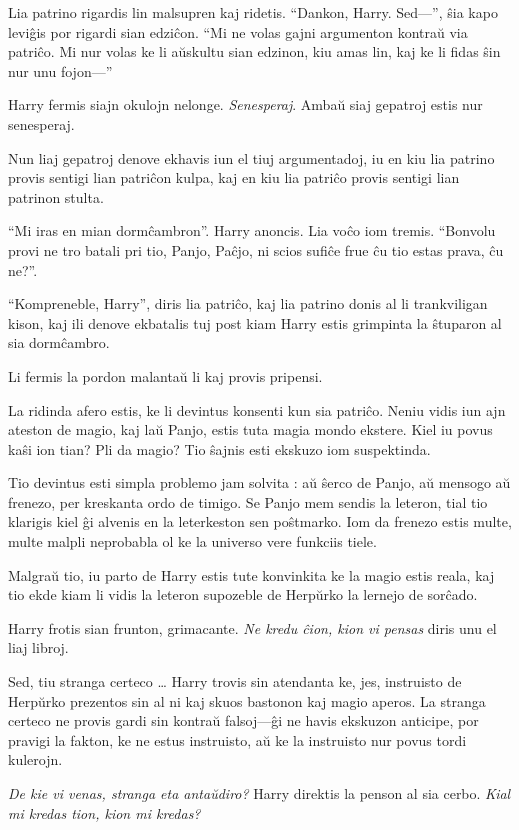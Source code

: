 Lia patrino rigardis lin malsupren kaj ridetis. ``Dankon,
Harry. Sed—'', ŝia kapo leviĝis por rigardi sian edziĉon. ``Mi ne volas
gajni argumenton kontraŭ via patriĉo. Mi nur volas ke li aŭskultu sian
edzinon, kiu amas lin, kaj ke li fidas ŝin nur unu fojon—''

Harry fermis siajn okulojn nelonge. \emph{Senesperaj}. Ambaŭ siaj
gepatroj estis nur senesperaj.

Nun liaj gepatroj denove ekhavis iun el tiuj argumentadoj, iu en kiu
lia patrino provis sentigi lian patriĉon kulpa, kaj en kiu lia patriĉo
provis sentigi lian patrinon stulta.

``Mi iras en mian dormĉambron''. Harry anoncis. Lia voĉo iom
tremis. ``Bonvolu provi ne tro batali pri tio, Panjo, Paĉjo, ni scios
sufiĉe frue ĉu tio estas prava, ĉu ne?''.

``Kompreneble, Harry'', diris lia patriĉo, kaj lia patrino donis al li
trankviligan kison, kaj ili denove ekbatalis tuj post kiam Harry estis
grimpinta la ŝtuparon al sia dormĉambro.

Li fermis la pordon malantaŭ li kaj provis pripensi.

La ridinda afero estis, ke li devintus konsenti kun sia patriĉo. Neniu
vidis iun ajn ateston de magio, kaj laŭ Panjo, estis tuta magia
mondo ekstere. Kiel iu povus kaŝi ion tian? Pli da magio? Tio ŝajnis
esti ekskuzo iom suspektinda.

Tio devintus esti simpla problemo jam solvita : aŭ ŝerco de Panjo, aŭ
mensogo aŭ frenezo, per kreskanta ordo de timigo. Se Panjo mem sendis
la leteron, tial tio klarigis kiel ĝi alvenis en la leterkeston sen
poŝtmarko. Iom da frenezo estis multe, multe malpli neprobabla ol ke
la universo vere funkciis tiele.

Malgraŭ tio, iu parto de Harry estis tute konvinkita ke la magio estis
reala, kaj tio ekde kiam li vidis la leteron supozeble de Herpŭrko la
lernejo de sorĉado.

Harry frotis sian frunton, grimacante. \emph{Ne kredu ĉion, kion vi pensas}
diris unu el liaj libroj.

Sed, tiu stranga certeco \ldots{} Harry trovis sin atendanta ke, jes,
instruisto de Herpŭrko prezentos sin al ni kaj skuos bastonon kaj
magio aperos. La stranga certeco ne provis gardi sin kontraŭ falsoj—ĝi
ne havis ekskuzon anticipe, por pravigi la fakton, ke ne estus
instruisto, aŭ ke la instruisto nur povus tordi kulerojn.

\emph{De kie vi venas, stranga eta antaŭdiro?} Harry direktis la penson al sia
cerbo. \emph{Kial mi kredas tion, kion mi kredas?}

